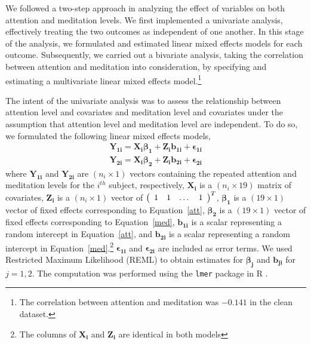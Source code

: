 \documentclass{article}[12pt]
\begin{document}
We followed a two-step approach in analyzing the effect of variables on both attention and meditation levels. We first implemented a univariate analysis, effectively treating the two outcomes as independent of one another. In this stage of the analysis, we formulated and estimated linear mixed effects models for each outcome. Subsequently, we carried out a bivariate analysis, taking the correlation between attention and meditation into consideration, by specifying and estimating a multivariate linear mixed effects model.\footnote{The correlation between attention and meditation was $-0.141$ in the clean dataset.}

The intent of the univariate analysis was to assess the relationship between attention level and covariates and meditation level and covariates under the assumption that attention level and meditation level are independent. To do so, we formulated the following linear mixed effects models,
\begin{align}
\mathbf{Y_{1i}} = \mathbf{X_{i}} \boldsymbol{\beta_{1}} + \mathbf{Z_{i}} \boldsymbol{b_{1i}} \label{att}
+ \boldsymbol{\epsilon_{1i}} \\
\mathbf{Y_{2i}} = \mathbf{X_{i}} \boldsymbol{\beta_{2}} + \mathbf{Z_{i}} \boldsymbol{b_{2i}}
+ \boldsymbol{\epsilon_{2i}} \label{med}
\end{align}
where $\mathbf{Y_{1i}}$ and $\mathbf{Y_{2i}}$ are $(n_i \times 1)$ vectors containing the repeated attention and meditation levels for the $i^{th}$ subject, respectively, $\mathbf{X_{i}}$ is a $(n_i \times 19)$ matrix of covariates, $\mathbf{Z_{i}}$ is a $(n_i \times 1)$ vector of 
$\left(\begin{array}{c c c c}
1 & 1 & \dots & 1
\end{array}\right)^T$, $\boldsymbol{\beta_{1}}$ is a $(19 \times 1)$ vector of fixed effects corresponding to Equation~\ref{att}, $\boldsymbol{\beta_{2}}$ is a $(19 \times 1)$ vector of fixed effects corresponding to Equation~\ref{med}, $\boldsymbol{b_{1i}}$ is a scalar representing a random intercept in Equation~\ref{att}, and $\boldsymbol{b_{2i}}$ is a scalar representing a random intercept in Equation~\ref{med}.\footnote{The columns of $\mathbf{X_{i}}$ and $\mathbf{Z_{i}}$ are identical in both models} $\boldsymbol{\epsilon_{1i}}$ and $\boldsymbol{\epsilon_{2i}}$ are included as error terms. We used Restricted Maximum Likelihood (REML) to obtain estimates for $\boldsymbol{\beta_{j}}$ and $\boldsymbol{b_{ji}}$ for $j = 1,2$. The computation was performed using the \texttt{lmer} package in R  \cite{lme4}.
\end{document}

